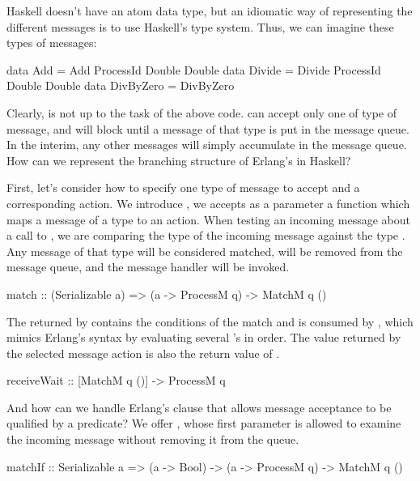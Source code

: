 \documentclass[preprint]{sigplanconf}
\begin{document}
Haskell doesn't have an atom data type, but an idiomatic way of representing the different messages is to use Haskell's type system. Thus, we can imagine these types of messages:

\begin{code}
data Add = Add ProcessId Double Double
data Divide = Divide ProcessId Double Double
data DivByZero = DivByZero
\end{code}

Clearly,  is not up to the task of the above code.  can accept only one of type of message, and will block until a message of that type is put in the message queue. In the interim, any other messages will simply accumulate in the message queue. How can we represent the branching structure of Erlang's  in Haskell?

First, let's consider how to specify one type of message to accept and a corresponding action. We introduce , we accepts as a parameter a function which maps a message of a  type to an action. When testing an incoming message about a call to , we are comparing the type of the incoming message against the type . Any message of that type will be considered matched, will be removed from the message queue, and the message handler will be invoked.

\begin{code}
match :: (Serializable a) => (a -> ProcessM q) -> MatchM q ()
\end{code}

The  returned by  contains the conditions of the match and is consumed by , which mimics Erlang's  syntax by evaluating several 's in order. The value returned by the selected message action is also the return value of .

\begin{code}
receiveWait :: [MatchM q ()] -> ProcessM q
\end{code}

And how can we handle Erlang's  clause that allows message acceptance to be qualified by a predicate? We offer , whose first parameter is allowed to examine the incoming message without removing it from the queue.

\begin{code}
matchIf :: Serializable a => (a -> Bool) -> (a -> ProcessM q) -> MatchM q ()
\end{code}
\end{document}
